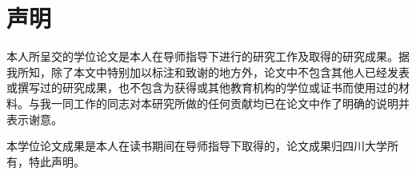 \chapter{声明}
\label{Chap_OriginalStatement}
本人所呈交的学位论文是本人在导师指导下进行的研究工作及取得的研究成果。据我所知，除了本文中特别加以标注和致谢的地方外，论文中不包含其他人已经发表或撰写过的研究成果，也不包含为获得\universityname 或其他教育机构的学位或证书而使用过的材料。与我一同工作的同志对本研究所做的任何贡献均已在论文中作了明确的说明并表示谢意。


本学位论文成果是本人在\universityname 读书期间在导师指导下取得的，论文成果归四川大学所有，特此声明。
\vspace{4cm}
\autograph
